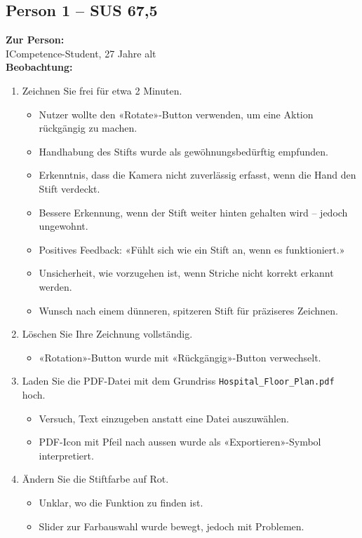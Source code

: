 \subsection{Person 1 – SUS 67{,}5}
\textbf{Zur Person:}\\
ICompetence-Student, 27 Jahre alt\\

\textbf{Beobachtung:}
\begin{enumerate}
    \item Zeichnen Sie frei für etwa 2 Minuten.
    \begin{itemize}
        \item Nutzer wollte den «Rotate»-Button verwenden, um eine Aktion rückgängig zu machen.
        \item Handhabung des Stifts wurde als gewöhnungsbedürftig empfunden.
        \item Erkenntnis, dass die Kamera nicht zuverlässig erfasst, wenn die Hand den Stift verdeckt.
        \item Bessere Erkennung, wenn der Stift weiter hinten gehalten wird – jedoch ungewohnt.
        \item Positives Feedback: «Fühlt sich wie ein Stift an, wenn es funktioniert.»
        \item Unsicherheit, wie vorzugehen ist, wenn Striche nicht korrekt erkannt werden.
        \item Wunsch nach einem dünneren, spitzeren Stift für präziseres Zeichnen.
    \end{itemize}

    \item Löschen Sie Ihre Zeichnung vollständig.
    \begin{itemize}
        \item «Rotation»-Button wurde mit «Rückgängig»-Button verwechselt.
    \end{itemize}

    \item Laden Sie die PDF-Datei mit dem Grundriss \texttt{Hospital\_Floor\_Plan.pdf} hoch.
    \begin{itemize}
        \item Versuch, Text einzugeben anstatt eine Datei auszuwählen.
        \item PDF-Icon mit Pfeil nach aussen wurde als «Exportieren»-Symbol interpretiert.
    \end{itemize}

    \item Ändern Sie die Stiftfarbe auf Rot.
    \begin{itemize}
        \item Unklar, wo die Funktion zu finden ist.
        \item Slider zur Farbauswahl wurde bewegt, jedoch mit Problemen.
    \end{itemize}


\end{enumerate}
